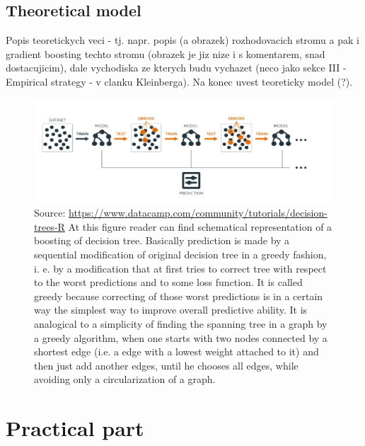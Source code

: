 \documentclass[12pt, twoside]{book} %
\begin{document}
\section{Theoretical model}    %
 
Popis teoretickych veci - tj. napr. popis (a obrazek) rozhodovacich stromu a pak i gradient boosting techto stromu (obrazek je jiz nize i s komentarem, snad dostacujicim), dale vychodiska ze kterych budu vychazet (neco jako sekce III - Empirical strategy - v clanku Kleinberga). Na konec uvest teoreticky model (?).


\begin{figure}[H]
\includegraphics[width=\textwidth]{boosting_scheme.jpg}
{\small Source: \url{https://www.datacamp.com/community/tutorials/decision-trees-R} \newline
At this figure reader can find schematical representation of a boosting of decision tree. Basically prediction is made by a sequential modification of original decision tree in a greedy fashion, i. e. by a modification that at first tries to correct tree with respect to the worst predictions and to some loss function. It is called greedy because correcting of those worst predictions is in a certain way the simplest way to improve overall predictive ability. It is analogical to a simplicity of finding the spanning tree in a graph by a greedy algorithm, when one starts with two nodes connected by a shortest edge (i.e. a edge with a lowest weight attached to it) and then just add another edges, until he chooses all edges, while avoiding only a circularization of a graph. }
\end{figure}




\chapter{Practical part}        %
\end{document}
